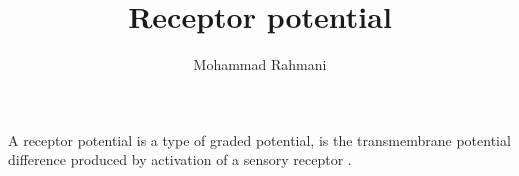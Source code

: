 \documentclass[a4paper]{article}
\title{Receptor potential}
\date{}
\author{Mohammad Rahmani}
\begin{document}
    \maketitle
    A receptor potential is a type of graded potential, is the transmembrane potential difference produced by activation of a sensory receptor .
    
    
\end{document}
